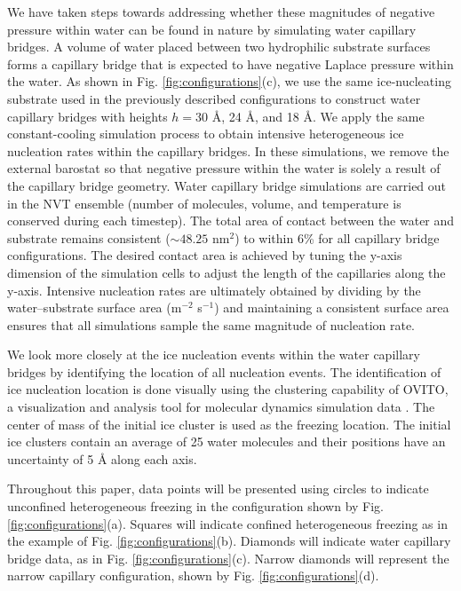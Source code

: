 \documentclass[journal abbreviation, manuscript]{copernicus}
\begin{document}
We have taken steps towards addressing whether these magnitudes of negative pressure within water can be found in nature by simulating water capillary bridges. A volume of water placed between two hydrophilic substrate surfaces forms a capillary bridge that is expected to have negative Laplace pressure within the water. As shown in Fig. \ref{fig:configurations}(c), we use the same ice-nucleating substrate used in the previously described configurations to construct water capillary bridges with heights $h = 30$ \AA{}, 24 \AA{}, and 18 \AA{}. We apply the same constant-cooling simulation process to obtain intensive heterogeneous ice nucleation rates within the capillary bridges. In these simulations, we remove the external barostat so that negative pressure within the water is solely a result of the capillary bridge geometry. Water capillary bridge simulations are carried out in the NVT ensemble (number of molecules, volume, and temperature is conserved during each timestep). The total area of contact between the water and substrate remains consistent ($\sim 48.25$ nm$^2$) to within 6\% for all capillary bridge configurations. The desired contact area is achieved by tuning the y-axis dimension of the simulation cells to adjust the length of the capillaries along the y-axis. Intensive nucleation rates are ultimately obtained by dividing by the water--substrate surface area (m$^{-2}$ s$^{-1}$) and maintaining a consistent surface area ensures that all simulations sample the same magnitude of nucleation rate.

We look more closely at the ice nucleation events within the water capillary bridges by identifying the location of all nucleation events. The identification of ice nucleation location is done visually using the clustering capability of OVITO, a visualization and analysis tool for molecular dynamics simulation data \citep{ovito}. The center of mass of the initial ice cluster is used as the freezing location. The initial ice clusters contain an average of 25 water molecules and their positions have an uncertainty of 5 \AA{} along each axis.

Throughout this paper, data points will be presented using circles to indicate unconfined heterogeneous freezing in the configuration shown by Fig. \ref{fig:configurations}(a). Squares will indicate confined heterogeneous freezing as in the example of Fig. \ref{fig:configurations}(b). Diamonds will indicate water capillary bridge data, as in Fig. \ref{fig:configurations}(c). Narrow diamonds will represent the narrow capillary configuration, shown by Fig. \ref{fig:configurations}(d).
\end{document}
